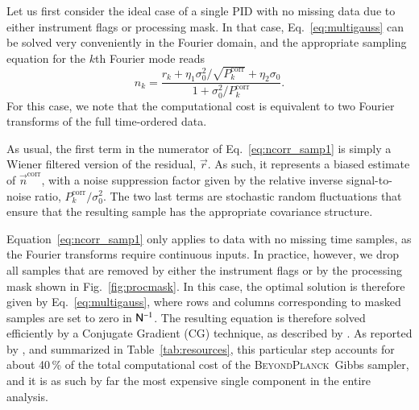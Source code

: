 \documentclass[onecolumn]{aa}
\newcommand{\n}[0]{\vec{n}}
\newcommand{\N}[0]{\tens{N}}
\renewcommand{\r}[0]{\vec{r}}
\newcommand{\BP}{\textsc{BeyondPlanck}}
\begin{document}
Let us first consider the ideal case of a single PID with no missing
data due to either instrument flags or processing mask. In that
case, Eq.~\eqref{eq:multigauss} can be solved very conveniently in
the Fourier domain, and the appropriate sampling equation for the $k$th
Fourier mode reads
\begin{equation}
n_k = \frac{r_k + \eta_1\sigma_0^2/\sqrt{P_k^{\mathrm{corr}}} + \eta_2\sigma_0
  }{1 + \sigma_0^2/P^{\mathrm{corr}}_k}.
\label{eq:ncorr_samp1}
\end{equation}
For this case, we note that the computational cost is equivalent to
two Fourier transforms of the full time-ordered data.

As usual, the first term in the numerator of Eq.~\eqref{eq:ncorr_samp1}
is simply a Wiener filtered version of the residual, $\r$. As such, it
represents a biased estimate of $\n^{\mathrm{corr}}$, with a noise
suppression factor given by the relative inverse signal-to-noise
ratio, $P^{\mathrm{corr}}_k/\sigma_0^2$. The two last terms are
stochastic random fluctuations that ensure that the resulting sample
has the appropriate covariance structure.

Equation~\eqref{eq:ncorr_samp1} only applies to data with no missing
time samples, as the Fourier transforms require continuous inputs. In
practice, however, we drop all samples that are removed by either the
instrument flags or by the processing mask shown in
Fig.~\ref{fig:procmask}. In this case, the optimal solution is
therefore given by Eq.~\eqref{eq:multigauss}, where rows and columns
corresponding to masked samples are set to zero in $\N^{-1} $. The resulting
equation is therefore solved efficiently by a Conjugate Gradient (CG)
technique, as described by \citet{bp02}. As reported by \citet{bp03},
and summarized in Table~\ref{tab:resources}, this particular step
accounts for about 40\,\% of the total computational cost of the
\BP\ Gibbs sampler, and it is as such by far the most expensive single
component in the entire analysis.
\end{document}
